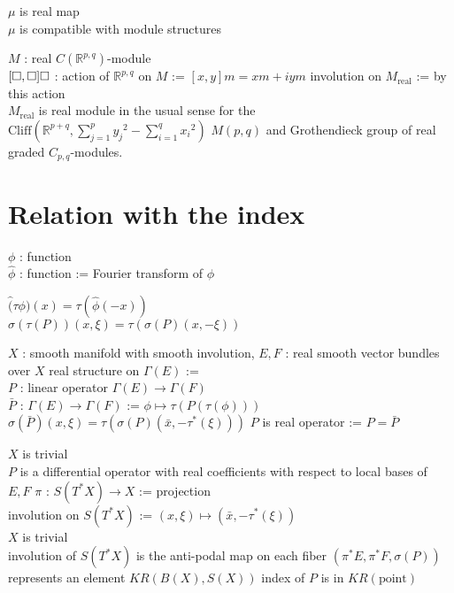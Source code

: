 \documentclass[dvipdfmx]{jsarticle}
\begin{document}
\begin{Theorem}
\itemprop
  \Then \(\mu\) is real map \\
  \Then \(\mu\) is compatible with module structures
\end{Theorem}

\begin{Theorem}
\itemprop
  \For \(M\) : real \(C(\mathbb{R}^{p,q})\)-module \\
  \Define \([\square , \square] \square\) : action of \(\mathbb{R}^{p,q}\) on \(M\) := \([x,y]m = xm + iym\)
  \Let involution on \(M_{\text{real}}\) := by this action \\
  \Then \(M_{\text{real}}\) is real module in the usual sense for the \(\text{Cliff}(\mathbb{R}^{p+q}, \sum_{j=1}^p {y_j}^2 - \sum_{i=1}^{q} {x_i}^2)\)
\itemprop
  \Then \(M(p,q)\) and Grothendieck group of real graded \(C_{p,q}\)-modules.
\end{Theorem}

\section*{Relation with the index}

\begin{Definition}
\itemdefi
  \For \(\phi\) : function \\
  \Define \(\hat{\phi}\) : function := Fourier transform of \(\phi\)
\end{Definition}

\begin{Theorem}
\itemprop
  \Then \(\hat(\tau{\phi})(x) = \tau(\hat{\phi}(-x))\) \\
  \Then \(\sigma(\tau (P))(x, \xi) = \tau(\sigma (P)(x, -\xi))\) 
\end{Theorem}

\begin{Theorem}
\itemwhen
  \For \(X\) : smooth manifold with smooth involution, \(E,F\) : real smooth vector bundles over \(X\)
  \Define real structure on \(\Gamma(E)\) :=  \\
  \For \(P\) : linear operator \(\Gamma(E) \to \Gamma(F)\) \\
  \Define \(\bar{P}\) : \(\Gamma(E) \to \Gamma(F)\) := \(\phi \mapsto \tau (P(\tau(\phi)))\)
\itemprop
  \Then \(\sigma (\bar{P})(x, \xi) = \tau (\sigma (P) (\bar{x}, - \tau^*(\xi)))\)
\itemdefi
  \Define \(P\) is real operator := \(P = \bar{P}\)
\end{Theorem}

\begin{Theorem}
\itemprop
  \IfHold \(X\) is trivial \\
  \Then \(P\) is a differential operator with real coefficients with respect to local bases of \(E,F\)
\itemprop
  \Let \(\pi\) : \(S(T^*X) \to X\) := projection \\
  \Let involution on \(S(T^*X)\) := \((x, \xi) \mapsto (\bar{x}, - \tau^*(\xi))\) \\
  \IfHold \(X\) is trivial \\
  \Then involution of \(S(T^*X)\) is the anti-podal map on each fiber
\itemprop
  \Then \((\pi^* E, \pi^* F, \sigma (P))\) represents an element \(KR(B(X), S(X))\)
\itemprop
  \Then index of \(P\) is in \(KR(\text{point})\)
\end{Theorem}
\end{document}
